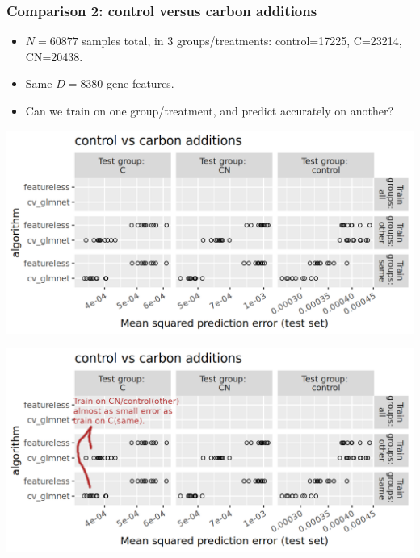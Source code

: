\documentclass{beamer}
\begin{document}

\begin{frame}
  \frametitle{Comparison 2: control versus carbon additions}
  \begin{itemize}
  \item $N=60877$ samples total, in 3 groups/treatments: control=17225, C=23214, CN=20438.
  \item Same $D=8380$ gene features.
  \item Can we train on one group/treatment, and predict accurately on another?
  \end{itemize}
\end{frame}

\begin{frame}
  \includegraphics[width=\textwidth]{qsip_pc2_all_new-control.vs.carbon.additions.other.png}
\end{frame}

\begin{frame}
  \includegraphics[width=\textwidth]{qsip_pc2_all_new-control.vs.carbon.additions.other.1.png}
\end{frame}
\end{document}
